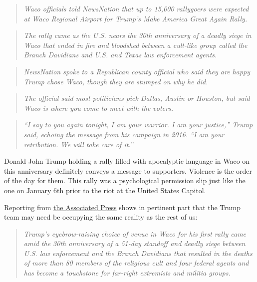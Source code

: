 \begin{quote}
\emph{Waco officials told NewsNation that up to 15,000 rallygoers were
expected at Waco Regional Airport for Trump's Make America Great Again
Rally.}
\end{quote}

\begin{quote}
\emph{The rally came as the U.S. nears the 30th anniversary of a deadly
siege in Waco that ended in fire and bloodshed between a cult-like group
called the Branch Davidians and U.S. and Texas law enforcement agents.}
\end{quote}

\begin{quote}
\emph{NewsNation spoke to a Republican county official who said they are
happy Trump chose Waco, though they are stumped on why he did.}
\end{quote}

\begin{quote}
\emph{The official said most politicians pick Dallas, Austin or Houston,
but said Waco is where you come to meet with the voters.}
\end{quote}

\begin{quote}
\emph{``I say to you again tonight, I am your warrior. I am your
justice,'' Trump said, echoing the message from his campaign in 2016.
``I am your retribution. We will take care of it.''}
\end{quote}

Donald John Trump holding a rally filled with apocalyptic language in
Waco on this anniversary definitely conveys a message to supporters.
Violence is the order of the day for them. This rally was a
psychological permission slip just like the one on January 6th prior to
the riot at the United States Capitol.

Reporting from
\href{https://apnews.com/article/trump-waco-rally-texas-9a5676b734bb087a977ffe0216d0a6a8}{the
Associated Press} shows in pertinent part that the Trump team may need
be occupying the same reality as the rest of us:

\begin{quote}
\emph{Trump's eyebrow-raising choice of venue in Waco for his first
rally came amid the 30th anniversary of a 51-day standoff and deadly
siege between U.S. law enforcement and the Branch Davidians that
resulted in the deaths of more than 80 members of the religious cult and
four federal agents and has become a touchstone for far-right extremists
and militia groups.}
\end{quote}

